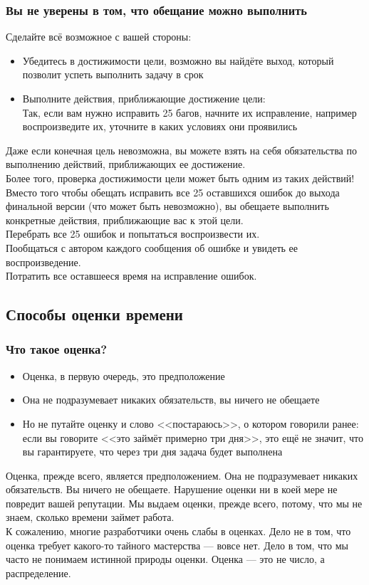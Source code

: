 \documentclass{../industrial-development}
\begin{document}
\begin{frame} \frametitle{Вы не уверены в том, что обещание можно выполнить}
Сделайте всё возможное с вашей стороны:
\begin{itemize}
	\item Убедитесь в достижимости цели, возможно вы найдёте выход, который позволит успеть выполнить задачу в срок
	\item Выполните действия, приближающие достижение цели:\\
	Так, если вам нужно исправить 25 багов, начните их исправление, например воспроизведите их, уточните в каких условиях они проявились
\end{itemize}
\end{frame}
\lecturenotes
Даже если конечная цель невозможна, вы можете взять на себя обязательства по выполнению действий, приближающих ее достижение.\\
Более того, проверка достижимости цели может быть одним из таких действий!\\
Вместо того чтобы обещать исправить все 25 оставшихся ошибок до выхода финальной версии (что может быть невозможно), вы обещаете выполнить конкретные действия, приближающие вас к этой цели.\\
Перебрать все 25 ошибок и попытаться воспроизвести их.\\
Пообщаться с автором каждого сообщения об ошибке и увидеть ее воспроизведение.\\
Потратить все оставшееся время на исправление ошибок.

\subsection{Способы оценки времени}
\begin{frame} \frametitle{Что такое оценка?}
\begin{itemize}
  \item Оценка, в первую очередь, это предположение
	\item Она не подразумевает никаких обязательств, вы ничего не обещаете
	\item Но не путайте оценку и слово <<постараюсь>>, о котором говорили ранее: если вы говорите <<это займёт примерно три дня>>, это ещё не значит, что вы гарантируете, что через три дня задача будет выполнена
\end{itemize}
\end{frame}
\lecturenotes
Оценка, прежде всего, является предположением. Она не подразумевает никаких обязательств. Вы ничего не обещаете. Нарушение оценки ни в коей мере не повредит вашей репутации. Мы выдаем оценки, прежде всего, потому, что мы не знаем, сколько времени займет работа.\\
К сожалению, многие разработчики очень слабы в оценках. Дело не в том, что оценка требует какого-то тайного мастерства — вовсе нет. Дело в том, что мы часто не понимаем истинной природы оценки. Оценка — это не число, а распределение. 
\end{document}
